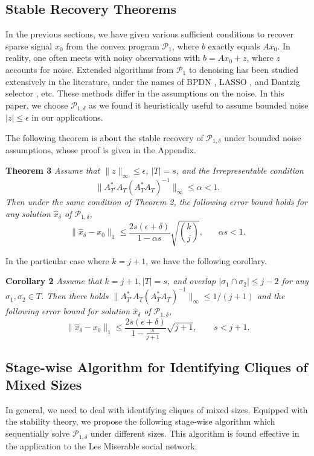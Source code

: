 \documentclass{article}
\begin{document}
\subsection{Stable Recovery Theorems}
In the previous sections, we have given various sufficient conditions to recover sparse signal $x_0$ from the convex program $\mathcal{P}_1$, 
where $b$ exactly equals $Ax_0$. In reality, one often meets with noisy observations with $b = A x_0 + z$,
where $z$ accounts for noise. Extended algorithms from $\mathcal{P}_1$ to denoising has been studied 
extensively in the literature, under the names of BPDN \cite{CheDonSau99}, LASSO \cite{Tib96-Lasso},
and Dantzig selector \cite{CanTao07-Dantzig}, etc. These methods differ in the assumptions on 
the noise. In this paper, we choose $\mathcal{P}_{1,\delta}$ as we found it heuristically useful 
to assume bounded noise $|z|\leq \epsilon$ in our applications. 

The following theorem is about the stable recovery of $\mathcal{P}_{1,\delta}$ under bounded noise assumptions, whose proof is given in the Appendix. 

\textbf{Theorem 3} {\it Assume that $\|z\|_\infty \leq \epsilon$, $|T|= s$, and the Irrepresentable condition 
\[ \|A^*_{T^c} A_T (A^*_T A_T)^{-1} \|_\infty \leq \alpha<1. \]
Then under the same condition of Theorem 2, the following error bound holds for any solution $\hat{x}_\delta$ of $\mathcal{P}_{1,\delta}$,
\[ \|\hat{x}_\delta - x_0 \|_1 \leq  \frac{2s (\epsilon + \delta)} {1 - \alpha s} \sqrt{k \choose j}, \ \ \ \ \ \ \ \ \alpha s <1. \] }

In the particular case where $k=j+1$, we have the following corollary. 

\textbf{Corollary 2} {\it Assume that $k=j+1, |T|= s$, and overlap $|\sigma_1\cap \sigma_2|\le j-2$ for  any $\sigma_1, \sigma_2\in T$. Then there holds 
$\|A^*_{T^c}A_T (A^*_TA_T)^{-1}\|_\infty \le 1/(j+1)$ and the following error bound for solution $\hat{x}_\delta$ of $\mathcal{P}_{1,\delta}$, 
\[ \|\hat{x}_\delta - x_0 \|_1 \leq  \frac{2s (\epsilon + \delta)} {1 - \frac{s}{j+1}} \sqrt{j+1}, \ \ \ \ \ \ \ \ \ s<j+1. \]
}


\subsection{Stage-wise Algorithm for Identifying Cliques of Mixed Sizes}

In general, we need to deal with identifying cliques of mixed sizes. Equipped with the stability theory, we propose the following stage-wise algorithm which sequentially solve $\mathcal{P}_{1,\delta}$ under different sizes. This algorithm is found effective in the application to the Les Miserable social network. 
\end{document}
